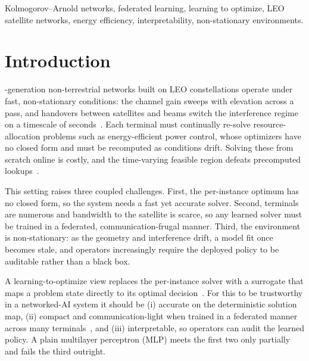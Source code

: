 \documentclass[journal]{IEEEtran}
\begin{document}
\begin{IEEEkeywords}
Kolmogorov--Arnold networks, federated learning, learning to optimize, LEO
satellite networks, energy efficiency, interpretability, non-stationary
environments.
\end{IEEEkeywords}

\section{Introduction}
-generation non-terrestrial networks built on LEO
constellations operate under fast, non-stationary conditions: the channel gain
sweeps with elevation across a pass, and handovers between satellites and beams
switch the interference regime on a timescale of seconds~\cite{kodheli2021ntn,
eom2020leo}. Each terminal must continually re-solve resource-allocation problems
such as energy-efficient power control, whose optimizers have no closed form and
must be recomputed as conditions drift. Solving these from scratch online is
costly, and the time-varying feasible region defeats precomputed
lookups~\cite{sun2018l2o}.

This setting raises three coupled challenges. First, the per-instance optimum has
no closed form, so the system needs a fast yet accurate solver. Second, terminals
are numerous and bandwidth to the satellite is scarce, so any learned solver must
be trained in a federated, communication-frugal manner. Third, the environment is
non-stationary: as the geometry and interference drift, a model fit once becomes
stale, and operators increasingly require the deployed policy to be auditable
rather than a black box.

A learning-to-optimize view replaces the per-instance solver with a surrogate that
maps a problem state directly to its optimal decision~\cite{sun2018l2o}. For this
to be trustworthy in a networked-AI system it should be (i) accurate on the
deterministic solution map, (ii) compact and communication-light when trained in a
federated manner across many terminals~\cite{mcmahan2017fedavg,shi2023kanfl}, and
(iii) interpretable, so operators can audit the learned policy. A plain multilayer
perceptron (MLP) meets the first two only partially and fails the third outright.
\end{document}

